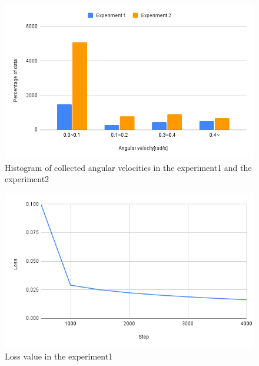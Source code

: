 \newpage
\begin{figure}[h]
  \centering
  \includegraphics[keepaspectratio, scale=0.5]{images/ang_sum.png}
  \caption{Histogram of collected angular velocities in the experiment1 and the experiment2}
  \label{Fig:hist}
  \end{figure}



  
\newpage
\begin{figure}[h]
  \centering
  \includegraphics[keepaspectratio, scale=0.31]{images/exp3_4000.png}
  \caption{Loss value in the experiment1}
  \label{Fig:exp2.2-4000}
  \end{figure}

